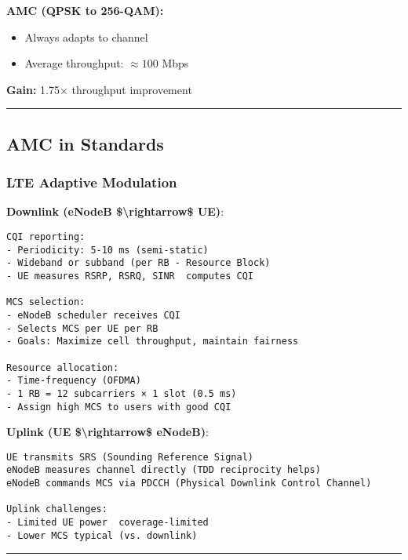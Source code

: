 \textbf{AMC (QPSK to 256-QAM):}
\begin{itemize}
\item Always adapts to channel
\item Average throughput: $\approx 100$ Mbps
\end{itemize}

\textbf{Gain:} 1.75$\times$ throughput improvement

\begin{center}\rule{0.5\linewidth}{0.5pt}\end{center}

\subsection{AMC in Standards}\label{amc-in-standards}

\subsubsection{LTE Adaptive Modulation}\label{lte-adaptive-modulation}

\textbf{Downlink (eNodeB \$\textbackslash rightarrow\$ UE)}:

\begin{verbatim}
CQI reporting:
- Periodicity: 5-10 ms (semi-static)
- Wideband or subband (per RB - Resource Block)
- UE measures RSRP, RSRQ, SINR  computes CQI

MCS selection:
- eNodeB scheduler receives CQI
- Selects MCS per UE per RB
- Goals: Maximize cell throughput, maintain fairness

Resource allocation:
- Time-frequency (OFDMA)
- 1 RB = 12 subcarriers × 1 slot (0.5 ms)
- Assign high MCS to users with good CQI
\end{verbatim}

\textbf{Uplink (UE \$\textbackslash rightarrow\$ eNodeB)}:

\begin{verbatim}
UE transmits SRS (Sounding Reference Signal)
eNodeB measures channel directly (TDD reciprocity helps)
eNodeB commands MCS via PDCCH (Physical Downlink Control Channel)

Uplink challenges:
- Limited UE power  coverage-limited
- Lower MCS typical (vs. downlink)
\end{verbatim}

\begin{center}\rule{0.5\linewidth}{0.5pt}\end{center}

